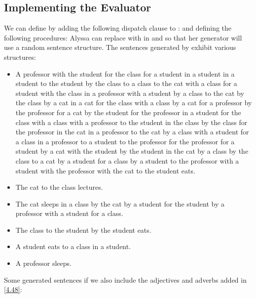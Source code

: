 \subsection{Implementing the  Evaluator}

\begin{exe}[4.50]
    We can define  by adding the following dispatch clause to 
    :
    and defining the following procedures:
    Alyssa can replace  with  in  
    and  so that her generator will use a random 
    sentence structure. The sentences generated by  exhibit 
    various structures:
    \begin{itemize}
        \item A professor with the student for the class for a student in 
            a student in a student to the student by the class to a class to the 
            cat with a class for a student with the class in a professor with 
            a student by a class to the cat by the class by a cat in a cat for 
            the class with a class by a cat for a professor by the professor for 
            a cat by the student for the professor in a student for the class 
            with a class with a professor to the student in the class by the 
            class for the professor in the cat in a professor to the cat by 
            a class with a student for a class in a professor to a student to 
            the professor for the professor for a student by a cat with the 
            student by the student in the cat by a class by the class to a cat 
            by a student for a class by a student to the professor with 
            a student with the professor with the cat to the student eats.
        \item The cat to the class lectures.
        \item The cat sleeps in a class by the cat by a student for the student 
            by a professor with a student for a class.
        \item The class to the student by the student eats.
        \item A student eats to a class in a student.
        \item A professor sleeps.
    \end{itemize}
    Some generated sentences if we also include the adjectives and adverbs added 
    in \autoref{4.48}:
    \begin{itemize}

\end{itemize}
\end{exe}
